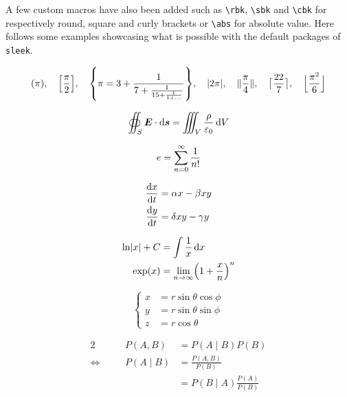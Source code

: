 \documentclass[a4paper, 12pt]{report}
\def\tbs{\textbackslash}
\begin{document}
    A few custom macros have also been added such as \texttt{\tbs{}rbk}, \texttt{\tbs{}sbk} and \texttt{\tbs{}cbk} for respectively round, square and curly brackets or \texttt{\tbs{}abs} for absolute value. Here follows some examples showcasing what is possible with the default packages of \texttt{sleek}.

    \[
        \rbk*{\pi}, \quad \sbk*{\frac{\pi}{2}}, \quad \cbk*{\pi=3 + \frac{1}{7 + \frac{1}{15 + \frac{1}{1 + \dots}}}}, \quad \abs{2 \pi}, \quad \norm{\frac{\pi}{4}}, \quad \ceil[\big]{\frac{22}{7}}, \quad \floor[\Big]{\frac{\pi^2}{6}}
    \]

    \begin{equation}\label{eq:gauss_law}
        \oiint_S \bm{E} \cdot \operatorname{d}\!{\bm{s}} = \iiint_V \frac{\rho}{\varepsilon_0} \operatorname{d}\!{V}
    \end{equation}

    \begin{equation*}
        e = \sum_{n=0}^\infty \frac{1}{n!}
    \end{equation*}

    \begin{subequations}
        \begin{align}
            \frac{\operatorname{d}\!{x}}{\operatorname{d}\!{t}} & = \alpha x - \beta xy \\
            \frac{\operatorname{d}\!{y}}{\operatorname{d}\!{t}} & = \delta xy - \gamma y
        \end{align}
    \end{subequations}

    \begin{align*}
        \ln \abs{x} + C & = \int \frac{1}{x} \d{x} \\
        \exp(x) & = \lim_{n \to \infty} \rbk*{1 + \frac{x}{n}}^n
    \end{align*}

    \begin{equation}
        \left\{
        \begin{aligned}
            x & = r \sin \theta \cos \phi \\
            y & = r \sin \theta \sin \phi \\
            z & = r \cos \theta
        \end{aligned}
        \right.
    \end{equation}

    \begin{alignat*}{2}
                              & & P(A, B)  & = P(A \mid B) P(B)                        \\
        \Leftrightarrow \quad & & P(A \mid B) & = \frac{P(A, B)}{P(B)}                 \\
                              & &          & = P(B \mid A) \frac{P(A)}{P(B)}
    \end{alignat*}
\end{document}
